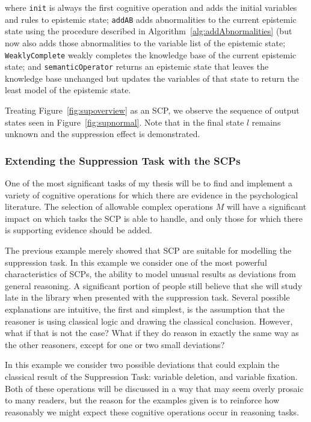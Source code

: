 \documentclass{article}
\begin{document}
where \texttt{init} is always the first cognitive operation and adds the initial variables and rules to epistemic state; \texttt{addAB} adds abnormalities to the current epistemic state using the procedure described in Algorithm~\ref{alg:addAbnormalities} (but now also adds those abnormalities to the variable list of the epistemic state; \texttt{WeaklyComplete} weakly completes the knowledge base of the current epistemic state; and \texttt{semanticOperator} returns an epistemic state that leaves the knowledge base unchanged but updates the variables of that state to return the least model of the epistemic state.

Treating Figure~\ref{fig:supoverview} as an SCP, we observe the sequence of output states seen in Figure~\ref{fig:supnormal}. Note that in the final state $l$ remains unknown and the suppression effect is demonstrated.

\subsubsection{Extending the Suppression Task with the SCPs}
One of the most significant tasks of my thesis will be to find and implement a variety of cognitive operations for which there are evidence in the psychological literature. The selection of allowable complex operations $M$ will have a significant impact on which tasks the SCP is able to handle, and only those for which there is supporting evidence should be added.

The previous example merely showed that SCP are suitable for modelling the suppression task. In this example we consider one of the most powerful characteristics of SCPs, the ability to model unusual results as deviations from general reasoning. A significant portion of people still believe that she will study late in the library when presented with the suppression task. Several possible explanations are intuitive, the first and simplest, is the assumption that the reasoner is using classical logic and drawing the classical conclusion. However, what if that is not the case? What if they do reason in exactly the same way as the other reasoners, except for one or two small deviations?

In this example we consider two possible deviations that could explain the classical result of the Suppression Task: variable deletion, and variable fixation. Both of these operations will be discussed in a way that may seem overly prosaic to many readers, but the reason for the examples given is to reinforce how reasonably we might expect these cognitive operations occur in reasoning tasks.
\end{document}
